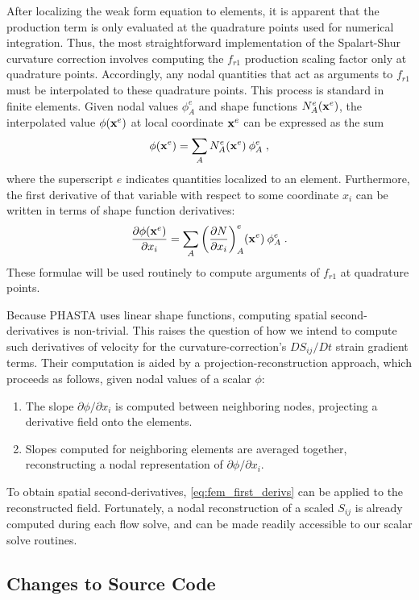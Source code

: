 \documentclass[11pt]{article}
\begin{document}
After localizing the weak form equation to elements, it is apparent that the production term is only evaluated at the quadrature points used for numerical integration. Thus, the most straightforward implementation of the Spalart-Shur curvature correction involves computing the $f_{r1}$ production scaling factor only at quadrature points. Accordingly, any nodal quantities that act as arguments to $f_{r1}$ must be interpolated to these quadrature points. This process is standard in finite elements. Given nodal values $\phi_A^e$ and shape functions $N^e_A(\mb{x}^e)$, the interpolated value $\phi(\mb{x}^e)$ at local coordinate $\mb{x}^e$ can be expressed as the sum
\begin{equation}
\phi(\mb{x}^e) = \sum_A N^e_A(\mb{x}^e) \: \phi_A^e
\;,
\end{equation}
where the superscript $e$ indicates quantities localized to an element. Furthermore, the first derivative of that variable with respect to some coordinate $x_i$ can be written in terms of shape function derivatives:
\begin{equation}
\pp{\phi(\mb{x}^e)}{x_i} = \sum_A \left(\pp{N}{x_i}\right)^e_A \! (\mb{x}^e) \: \phi_A^e
\;.
\label{eq:fem_first_derivs}
\end{equation}
These formulae will be used routinely to compute arguments of $f_{r1}$ at quadrature points.

Because PHASTA uses linear shape functions, computing spatial second-derivatives is non-trivial. This raises the question of how we intend to compute such derivatives of velocity for the curvature-correction's $D S_{ij} / D t$ strain gradient terms.  Their computation is aided by a projection-reconstruction approach, which proceeds as follows, given nodal values of a scalar $\phi$:
\begin{enumerate}
\item The slope $\partial \phi / \partial x_i$ is computed between neighboring nodes, projecting a derivative field onto the elements.
\item Slopes computed for neighboring elements are averaged together, reconstructing a nodal representation of $\partial \phi / \partial x_i$.
\end{enumerate}
To obtain spatial second-derivatives, \eqref{eq:fem_first_derivs} can be applied to the reconstructed field. Fortunately, a nodal reconstruction of a scaled $S_{ij}$ is already computed during each flow solve, and can be made readily accessible to our scalar solve routines.

\subsection{Changes to Source Code}
\end{document}
